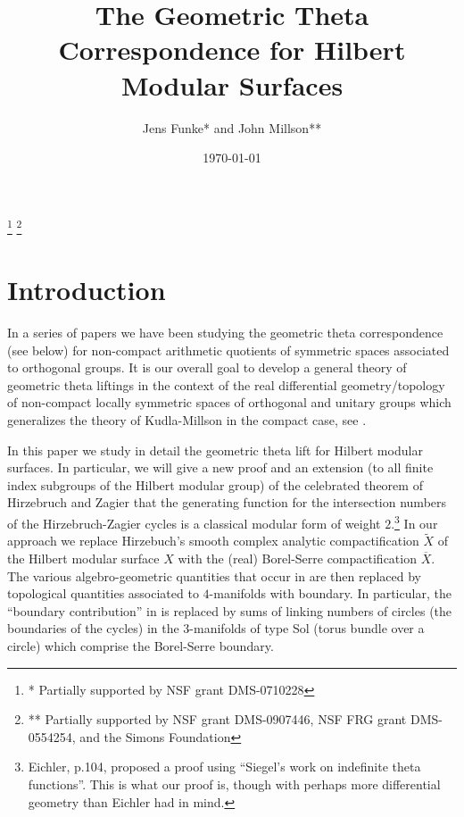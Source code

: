 \documentclass[12pt,leqno]{amsart}
\numberwithin{equation}{section}
\theoremstyle{plain}
\theoremstyle{definition}
\theoremstyle{remark}
\begin{document}
\title[The Geometric Theta Correspondence for Hilbert Modular Surfaces]
{The Geometric Theta Correspondence for Hilbert Modular Surfaces }

\author[Jens Funke and John Millson]{Jens Funke* and John Millson**}
\thanks{* Partially supported by NSF grant DMS-0710228}
\thanks{** Partially supported by NSF grant DMS-0907446, NSF FRG grant DMS-0554254, and the Simons Foundation}
\address{Department of Mathematical Sciences, University of Durham, Science Laboratories,
South Rd, Durham DH1 3LE, United Kingdom}
\address{Department of Mathematics, University of Maryland, College Park, MD
20742, USA} 




\date{\today}


\maketitle

\section{Introduction}

In a series of papers \cite{FM1,FMcoeff,FMres,FMspec} we have been studying the geometric theta correspondence (see below) for non-compact arithmetic quotients of symmetric spaces associated to orthogonal groups. It is our overall goal to develop a general theory of geometric theta liftings in the context of the real differential geometry/topology of non-compact locally symmetric spaces of orthogonal and unitary groups which generalizes the theory of Kudla-Millson in the compact case, see \cite{KM90}. 

In this paper we study in detail the geometric theta lift for Hilbert modular surfaces. In particular, we will give a new proof and an extension (to all finite index subgroups of the Hilbert modular group) of the celebrated theorem of Hirzebruch and Zagier \cite{HZ} that the generating function for the intersection numbers of the Hirzebruch-Zagier cycles is a classical modular form of weight $2$.\footnote{Eichler, \cite{HZ} p.104, proposed a proof using ``Siegel's work on indefinite theta functions''. This is what our proof is, though with perhaps more differential geometry than Eichler had in mind.} In our approach we replace Hirzebuch's smooth complex analytic compactification $\tilde{X}$ of the Hilbert modular surface $X$ with the (real) Borel-Serre compactification $\overline{X}$. The various algebro-geometric quantities that occur in \cite{HZ} are then replaced by topological quantities associated to $4$-manifolds with boundary. In particular, the ``boundary contribution'' in \cite{HZ} is replaced by sums of linking numbers of circles (the boundaries of the cycles) in the $3$-manifolds of type Sol (torus bundle over a circle) which comprise the Borel-Serre boundary. 
\end{document}
